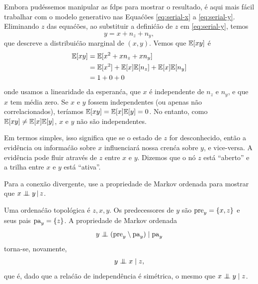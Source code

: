 \begin{exenumerate}
\begin{solution}
        Embora pud\'essemos manipular as fdps para mostrar o resultado, \'e
        aqui mais f\'acil trabalhar com o modelo generativo nas Equa\'c\~oes
        \eqref{eq:serial-x} a \eqref{eq:serial-y}. Eliminando $z$
        das equa\'c\~oes, ao substituir a defini\'c\~ao de $z$ em
        \eqref{eq:serial-y}, temos
        \begin{equation}
            y = x + n_z + n_y,
        \end{equation}
        que descreve a distribui\'c\~ao marginal de $(x, y)$. Vemos
        que $\mathbb{E}[xy]$ \'e
        \begin{align}
            \mathbb{E}[xy] & = \mathbb{E}[x^2 + xn_z + x n_y]\\
            & =  \mathbb{E}[x^2] + \mathbb{E}[x]\mathbb{E}[n_z] + \mathbb{E}[x]\mathbb{E}[n_y]\\
            & = 1 + 0 + 0
        \end{align}
        onde usamos a linearidade da esperan\'ca, que $x$ \'e
        independente de $n_z$ e $n_y$, e que $x$ tem m\'edia
        zero. Se $x$ e $y$ fossem independentes (ou apenas n\~ao correlacionados),
        ter\'iamos $\mathbb{E}[xy] = \mathbb{E}[x]\mathbb{E}[y] = 0$. No entanto, como $\mathbb{E}[xy] \neq \mathbb{E}[x]
        \mathbb{E}[y]$, $x$ e $y$ n\~ao s\~ao independentes.
        
        Em termos simples, isso significa que se o estado de $z$ for
        desconhecido, ent\~ao a evid\^encia ou informa\'c\~ao sobre $x$ influenciar\'a
        nossa cren\'ca sobre $y$, e vice-versa. A evid\^encia pode
        fluir atrav\'es de $z$ entre $x$ e $y$. Dizemos que o n\'o $z$
        est\'a ``aberto'' e a trilha entre $x$ e $y$ est\'a ``ativa''.
        
    \end{solution}
    \item Para a conex\~ao divergente, use a propriedade de Markov ordenada
    para mostrar que $x \mathrel{\perp\mspace{-10mu}\perp} y \,|\, z$.
    \begin{solution}
        Uma ordena\'c\~ao topol\'ogica \'e $z, x, y$. Os predecessores de
        $y$ s\~ao $\mathrm{pre}_y = \{x, z\}$ e seus pais $\mathrm{pa}_y = \{z\}$. A
        propriedade de Markov ordenada
        \begin{equation}
            y \mathrel{\perp\mspace{-10mu}\perp} ( \mathrm{pre}_y \setminus \mathrm{pa}_y ) \mid \mathrm{pa}_y
        \end{equation}
        torna-se, novamente,
        \begin{equation}
            y \mathrel{\perp\mspace{-10mu}\perp} x \mid z,
        \end{equation}
        que \'e, dado que a rela\'c\~ao de independ\^encia \'e sim\'etrica, o
        mesmo que $x \mathrel{\perp\mspace{-10mu}\perp} y \mid z$.
        

\end{solution}
\end{exenumerate}
